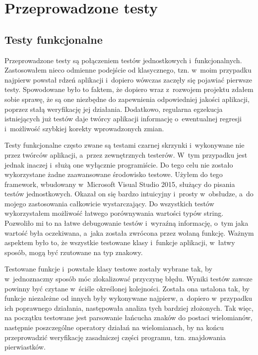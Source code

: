 \chapter{Przeprowadzone testy}

\section{Testy funkcjonalne}

Przeprowadzone testy są połączeniem testów jednostkowych i~funkcjonalnych. Zastosowałem nieco odmienne podejście od klasycznego, tzn. w~moim przypadku najpierw powstał rdzeń aplikacji i~dopiero wówczas zaczęły się pojawiać pierwsze testy. Spowodowane było to faktem, że dopiero wraz z~rozwojem projektu zdałem sobie sprawę, że są one niezbędne do zapewnienia odpowiedniej jakości aplikacji, poprzez stałą weryfikację jej działania. Dodatkowo, regularna egzekucja istniejących już testów daje twórcy aplikacji informację o~ewentualnej regresji i~możliwość szybkiej korekty wprowadzonych zmian.

Testy funkcjonalne często zwane są testami czarnej skrzynki i~wykonywane nie przez twórców aplikacji, a~przez zewnętrznych testerów. W~tym przypadku jest jednak inaczej i~służą one wyłącznie programiście. Do tego celu nie zostało wykorzystane żadne zaawansowane środowisko testowe. Użyłem do tego framework, wbudowany w~Microsoft Visual Studio 2015, służący do pisania testów jednostkowych. Okazał on się bardzo intuicyjny i~prosty w~obsłudze, a~do mojego zastosowania całkowicie wystarczający. Do wszystkich testów wykorzystałem możliwość łatwego porównywania wartości typów string. Pozwoliło mi to na łatwe debugowanie testów i~wyraźną informację, o~tym jaka wartość była oczekiwana, a~jaka została zwrócona przez wołaną funkcję. Ważnym aspektem było to, że wszystkie testowane klasy i~funkcje aplikacji, w~łatwy sposób, mogą być rzutowane na typ znakowy.

Testowane funkcje i~powstałe klasy testowe zostały wybrane tak, by w~jednoznaczny sposób móc zlokalizować przyczynę błędu. Wyniki testów zawsze powinny być czytane w~ściśle określonej kolejności. Została ona ustalona tak, by funkcje niezależne od innych były wykonywane najpierw, a~dopiero w~przypadku ich poprawnego działania, następowała analiza tych bardziej złożonych. Tak więc, na początku testowane jest parsowanie łańcucha znaków do postaci wielomianów, następnie poszczególne operatory działań na wielomianach, by na końcu przeprowadzić weryfikację zasadniczej części programu, tzn. znajdowania pierwiastków.

